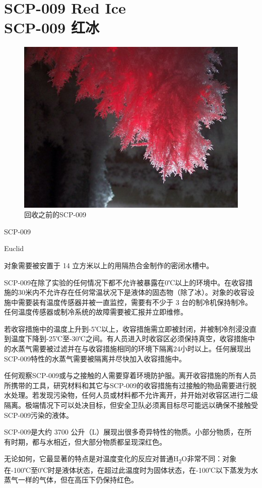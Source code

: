 \chapter[SCP-009 红冰]{
	SCP-009 Red Ice\\
	SCP-009 红冰
}

\label{chap:SCP-009}

\begin{figure}[H]
	\centering
	\includegraphics[width=0.5\linewidth]{images/SCP-009.jpg}
	\caption*{回收之前的SCP-009}
\end{figure}

SCP-009

Euclid

对象需要被安置于 14 立方米以上的用隔热合金制作的密闭水槽中。

SCP-009在除了实验的任何情况下都不允许被暴露在0℃以上的环境中。在收容措施的30米内不允许存在任何常温状况下是液体的固态物（除了冰）。对象的收容设施中需要装有温度传感器并被一直监控，需要有不少于 3 台的制冷机保持制冷。任何温度传感器或制冷系统的故障需要被汇报并立即维修。

若收容措施中的温度上升到-5℃以上，收容措施需立即被封闭，并被制冷剂浸没直到温度下降到-25℃至-30℃之间。有人员进入时收容区必须保持真空，收容措施中的水蒸气需要被过滤并在与收容措施相同的环境下隔离24小时以上。任何展现出SCP-009特性的水蒸气需要被隔离并尽快加入收容措施中。

任何观察SCP-009或与之接触的人需要穿着环境防护服。离开收容措施的所有人员所携带的工具，研究材料和其它与SCP-009的收容措施有过接触的物品需要进行脱水处理。若发现污染物，任何人员或材料都不允许离开，并开始对收容区进行二级隔离。极端情况下可以处决目标，但安全卫队必须离目标尽可能远以确保不接触受SCP-009污染的液体。

SCP-009是大约 3700 公升（L）展现出很多奇异特性的物质。小部分物质，在所有时期，都与水相近，但大部分物质都呈现深红色。

无论如何，它最显著的特点是对温度变化的反应对普通H\textsubscript{2}O非常不同：对象在-100℃至0℃时是液体状态，在超过此温度时为固体状态，在-100℃以下蒸发为水蒸气一样的气体，但在高压下仍保持红色。

